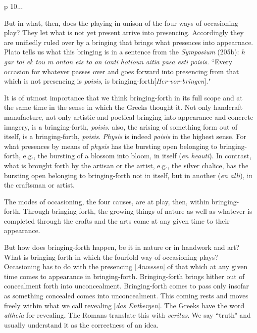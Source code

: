 p 10...

But in what, then, does the playing in unison of the four ways of occasioning play? They let what is not yet present arrive into presencing. Accordingly they are unifiedly ruled over by a bringing that brings what presences into appearnace. Plato tells us what this bringing is in a sentence from the \textit{Symposium} (205b): \textit{h gar toi ek tou m onton eis to on ionti hotioun aitia pasa esti poisis}. ``Every occasion for whatever passes over and goes forward into presencing from that which is not presencing is \textit{poisis}, is bringing-forth[\textit{Her-vor-bringen}]."

It is of utmost importance that we think bringing-forth in its full scope and at the same time in the sense in which the Greeks thought it. Not only handcraft manufacture, not only artistic and poetical bringing into appearance and concrete imagery, is a bringing-forth, \textit{poisis}.  also, the arising of something form out of itself, is a bringing-forth, \textit{poisis}. \textit{Physis} is indeed \textit{poisis} in the highest sense. For what presences by means of \textit{physis} has the bursting open belonging to bringing-forth, e.g., the bursting of a blossom into bloom, in itself (\textit{en heauti}). In contrast, what is brought forth by the artisan or the artist, e.g., the silver chalice, has the bursting open belonging to bringing-forth not in itself, but in another (\textit{en alli}), in the craftsman or artist.

The modes of occasioning, the four causes, are at play, then, within bringing-forth. Through bringing-forth, the growing things of nature as well as whatever is completed through the crafts and the arts come at any given time to their appearance.

But how does bringing-forth happen, be it in nature or in handwork and art? What is bringing-forth in which the fourfold way of occasioning plays? Occasioning has to do with the presencing [\textit{Anwesen}] of that which at any given time comes to appearance in bringing-forth. Bringing-forth brings hither out of concealment forth into unconcealment. Bringing-forth comes to pass only insofar as something concealed comes into unconcealment. This coming rests and moves freely within what we call revealing [\textit{das Entbergen}]. The Greeks have the word \textit{altheia} for revealing. The Romans translate this with \textit{veritas}. We say ``truth" and usually understand it as the correctness of an idea.



